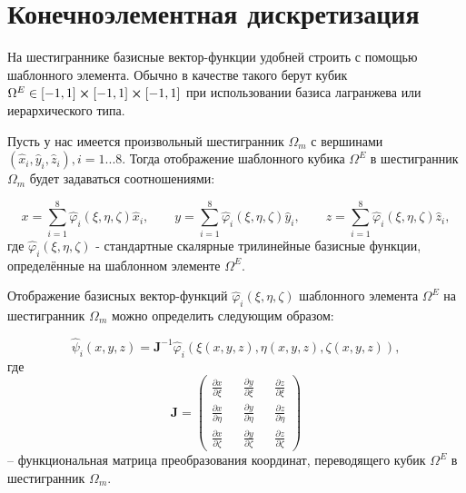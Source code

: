 \section{Конечноэлементная дискретизация}

На шестиграннике базисные вектор-функции удобней строить с помощью шаблонного элемента. Обычно в качестве такого берут кубик $\Omega^E \in \left[-1, 1\right] \cross \left[-1, 1\right] \cross \left[-1, 1\right]$ при использовании базиса лагранжева или иерархического типа.

Пусть у нас имеется произвольный шестигранник $\Omega_m$ с вершинами $\left(\hat{x}_i, \hat{y}_i, \hat{z}_i\right), i = 1...8$. Тогда отображение шаблонного кубика $\Omega^E$ в шестигранник $\Omega_m$ будет задаваться соотношениями:

\begin{equation} \label{eq_1_8}
	x = \sum_{i=1}^8 \hat{\varphi}_i (\xi, \eta, \zeta)\hat{x}_i, \qquad  y = \sum_{i=1}^8 \hat{\varphi}_i (\xi, \eta, \zeta)\hat{y}_i, \qquad  z = \sum_{i=1}^8 \hat{\varphi}_i (\xi, \eta, \zeta)\hat{z}_i,
\end{equation}
где $\hat{\varphi}_i (\xi, \eta, \zeta)$ - стандартные скалярные трилинейные базисные функции, определённые на шаблонном элементе $\Omega^E$.

Отображение базисных вектор-функций $\hat{\varphi}_i (\xi, \eta, \zeta)$ шаблонного элемента $\Omega^E$ на шестигранник $\Omega_m$ можно определить следующим образом:

\begin{equation} \label{eq_1_9}
	\hat{\text{$\psi$}}_i (x, y, z) = \textbf{J}^{-1} \hat{\varphi}_i (\xi(x, y, z), \eta(x, y, z), \zeta(x, y, z)),
\end{equation}
где 
\begin{equation} \label{eq_1_10}
	\textbf{J} = 
	\begin{pmatrix}
		\frac{\partial x}{\partial \xi} && \frac{\partial y}{\partial \xi} && \frac{\partial z}{\partial \xi} \\
		
		\frac{\partial x}{\partial \eta} && \frac{\partial y}{\partial \eta} && \frac{\partial z}{\partial \eta} \\
		
		\frac{\partial x}{\partial \zeta} && \frac{\partial y}{\partial \zeta} && \frac{\partial z}{\partial \zeta}
	\end{pmatrix}
\end{equation}
 – функциональная матрица преобразования координат, переводящего кубик $\Omega^E$ в шестигранник $\Omega_m$.

